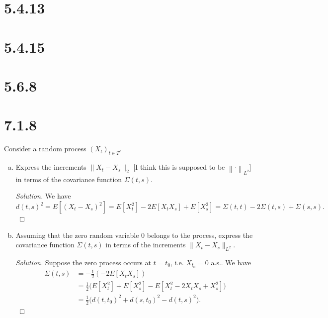 \documentclass[11pt,letterpaper]{report}
\newcommand{\Lp}[2]{\left\|{#1}\right\|_{L^{#2}}}
\newenvironment{solution}
{\begin{proof}[Solution]}
{\end{proof}}
\begin{document}
\section*{5.4.13}











\section*{5.4.15}











\section*{5.6.8}











\section*{7.1.8}
Consider a random process $(X_t)_{t\in T}$.
\begin{enumerate}[(a)]
	\item Express the increments $\|X_t-X_s\|_2$ [I think this is supposed to be $\Lp{\cdot}{2}$] in terms of the covariance function $\Sigma(t, s)$.
	\begin{solution}
		We have
		\[
		d(t,s)^2 = E[(X_t-X_s)^2] = E[X_t^2]-2E[X_tX_s]+E[X_s^2] = \Sigma(t,t)-2\Sigma(t,s)+\Sigma(s,s).
		\]
	\end{solution}

	\item Assuming that the zero random variable 0 belongs to the process, express the covariance function $\Sigma(t,s)$ in terms of the increments $\|X_t-X_s\|_{L^2}$.
	\begin{solution}
		Suppose the zero process occurs at $t=t_0$, i.e. $X_{t_0} = 0$ a.s.. We have
		\begin{align*}
			\Sigma(t,s) &= -\frac{1}{2}(-2E[X_tX_s])\\
			&= \frac{1}{2}\big(E[X_t^2]+E[X_s^2]-E[X_t^2 -2X_tX_s+X_s^2] \big)\\
			&= \frac{1}{2}\big(d(t,t_0)^2 + d(s,t_0)^2-d(t,s)^2 \big).
		\end{align*}
	\end{solution}
\end{enumerate}
\end{document}
